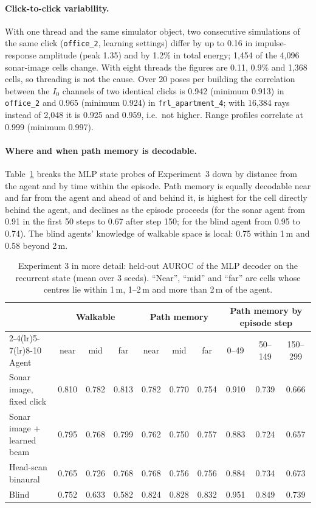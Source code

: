 \paragraph{Click-to-click variability.} With one thread and the same simulator object, two consecutive simulations of the same click (\texttt{office\_2}, learning settings) differ by up to 0.16 in impulse-response amplitude (peak 1.35) and by 1.2\% in total energy; 1{,}454 of the 4{,}096 sonar-image cells change. With eight threads the figures are 0.11, 0.9\% and 1{,}368 cells, so threading is not the cause. Over 20 poses per building the correlation between the $I_0$ channels of two identical clicks is 0.942 (minimum 0.913) in \texttt{office\_2} and 0.965 (minimum 0.924) in \texttt{frl\_apartment\_4}; with 16{,}384 rays instead of 2{,}048 it is 0.925 and 0.959, i.e.\ not higher. Range profiles correlate at 0.999 (minimum 0.997).

\paragraph{Where and when path memory is decodable.} Table~\ref{tab:probedetail} breaks the MLP state probes of Experiment~3 down by distance from the agent and by time within the episode. Path memory is equally decodable near and far from the agent and ahead of and behind it, is highest for the cell directly behind the agent, and declines as the episode proceeds (for the sonar agent from 0.91 in the first 50 steps to 0.67 after step 150; for the blind agent from 0.95 to 0.74). The blind agents' knowledge of walkable space is local: 0.75 within 1\,m and 0.58 beyond 2\,m.

\begin{table}[h]
\caption{Experiment 3 in more detail: held-out AUROC of the MLP decoder on the recurrent state (mean over 3 seeds). ``Near'', ``mid'' and ``far'' are cells whose centres lie within 1\,m, 1--2\,m and more than 2\,m of the agent.}
\label{tab:probedetail}
\centering\small
\begin{tabular}{lccccccccc}
\toprule
 & \multicolumn{3}{c}{Walkable} & \multicolumn{3}{c}{Path memory} & \multicolumn{3}{c}{Path memory by episode step} \\
\cmidrule(lr){2-4}\cmidrule(lr){5-7}\cmidrule(lr){8-10}
Agent & near & mid & far & near & mid & far & 0--49 & 50--149 & 150--299 \\
\midrule
Sonar image, fixed click & 0.810 & 0.782 & 0.813 & 0.782 & 0.770 & 0.754 & 0.910 & 0.739 & 0.666 \\
Sonar image + learned beam & 0.795 & 0.768 & 0.799 & 0.762 & 0.750 & 0.757 & 0.883 & 0.724 & 0.657 \\
Head-scan binaural & 0.765 & 0.726 & 0.768 & 0.768 & 0.756 & 0.756 & 0.884 & 0.734 & 0.673 \\
Blind & 0.752 & 0.633 & 0.582 & 0.824 & 0.828 & 0.832 & 0.951 & 0.849 & 0.739 \\
\bottomrule
\end{tabular}
\end{table}
